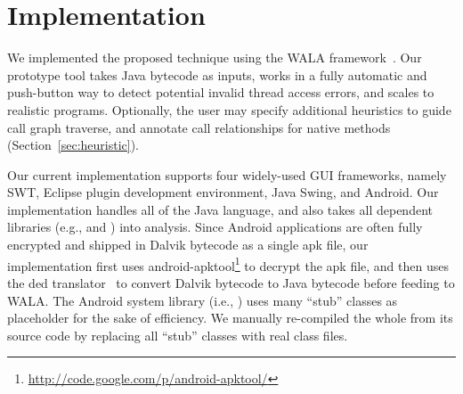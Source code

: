 \section{Implementation}
\label{sec:implementation}

We implemented the proposed technique using the WALA framework~\cite{walatutorial}.
Our prototype tool takes Java bytecode as inputs, works in a fully
automatic and push-button way to detect potential invalid thread access
errors, and scales to realistic programs.  
Optionally, the user may specify additional heuristics to guide call graph
traverse, and annotate call relationships for native methods (Section~\ref{sec:heuristic}).

Our current implementation supports four widely-used GUI frameworks, namely
SWT, Eclipse plugin development environment, Java Swing, and Android.
Our implementation handles all of the Java language, and also takes
all dependent libraries (e.g.,  and )
into analysis. Since Android applications are often fully encrypted and shipped in Dalvik
bytecode as a single apk file, our implementation first uses
android-apktool\footnote{\url{http://code.google.com/p/android-apktool/}} to
decrypt the apk file, and then uses the 
ded translator~\cite{Enck:2011:SAA:2028067.2028088} to convert
Dalvik bytecode to Java bytecode before feeding to WALA.  The Android system
library (i.e., ) uses many ``stub'' classes as
placeholder for the sake of efficiency. We manually re-compiled the whole
 from its source code by replacing all ``stub'' classes
with real class files.
